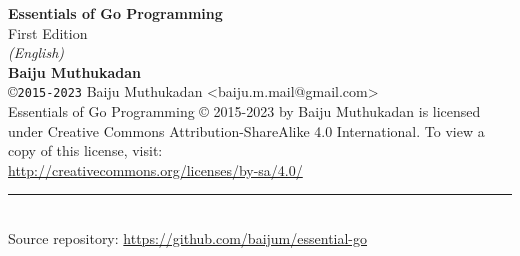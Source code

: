 \newpage
{}

{\sf\bfseries Essentials of Go Programming }\\
{\sf First Edition}\\
\textit{(English)}\\[3mm]
{\sf\bfseries Baiju Muthukadan}\\[.1in]
{\small \copyright}{\small \tt 2015-2023} {\small Baiju Muthukadan <baiju.m.mail@gmail.com>}\\

Essentials of Go Programming {\small \copyright} 2015-2023 by Baiju Muthukadan
is licensed under Creative Commons Attribution-ShareAlike 4.0 International. To
view a copy of this license, visit:\\
\url{http://creativecommons.org/licenses/by-sa/4.0/}

\rule{200pt}{0.4pt}\\[3mm]

Source repository: \url{https://github.com/baijum/essential-go}
